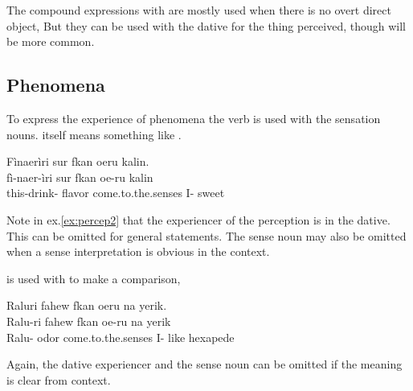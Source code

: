 The compound expressions with  are mostly used when there is
no overt direct object,    But they can
be used with the dative for the thing perceived,   though   will
be more common.

\subsection{Phenomena}   
To express the experience of phenomena the verb  is used with
the sensation nouns.   itself means something like
.

\begin{interlin} \label{ex:percep2}
\glll Fìnaerìri sur fkan oeru kalin. \\
    fì-naer-ìri sur fkan oe-ru kalin \\
  this-drink- flavor come.to.the.senses I- sweet \\
 \Ipawl{}
\end{interlin}

\noindent Note in ex.\ref{ex:percep2} that the experiencer of the
perception is in the dative.  This can be omitted for general
statements.  The sense noun may also be omitted when a sense
interpretation is obvious in the context.

 is used with   to make a comparison,

\begin{interlin}
\glll Raluri fahew fkan oeru na yerik. \\
    Ralu-ri fahew fkan oe-ru na yerik \\
    Ralu- odor come.to.the.senses I- like hexapede \\
 \Ipawl{}
\end{interlin}

\noindent Again, the dative experiencer and the sense noun can be
omitted if the meaning is clear from context.
